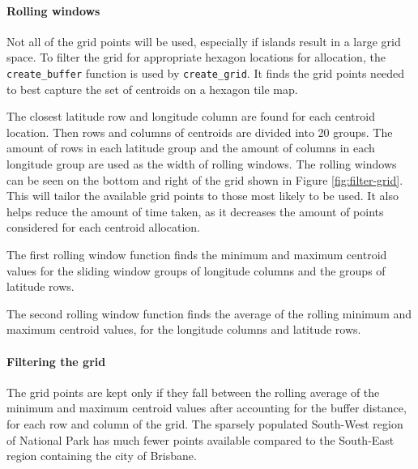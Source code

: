 \documentclass{monashthesis}
\begin{document}
\hypertarget{rolling-windows}{%
\paragraph{Rolling windows}\label{rolling-windows}}

Not all of the grid points will be used, especially if islands result in a large grid space.
To filter the grid for appropriate hexagon locations for allocation, the \texttt{create\_buffer} function is used by \texttt{create\_grid}.
It finds the grid points needed to best capture the set of centroids on a hexagon tile map.

The closest latitude row and longitude column are found for each centroid location. Then rows and columns of centroids are divided into 20 groups.
The amount of rows in each latitude group and the amount of columns in each longitude group are used as the width of rolling windows. The rolling windows can be seen on the bottom and right of the grid shown in Figure \ref{fig:filter-grid}.
This will tailor the available grid points to those most likely to be used.
It also helps reduce the amount of time taken, as it decreases the amount of points considered for each centroid allocation.

The first rolling window function finds the minimum and maximum centroid values for the sliding window groups of longitude columns and the groups of latitude rows.

The second rolling window function finds the average of the rolling minimum and maximum centroid values, for the longitude columns and latitude rows.

\hypertarget{filtering-the-grid}{%
\paragraph{Filtering the grid}\label{filtering-the-grid}}

The grid points are kept only if they fall between the rolling average of the minimum and maximum centroid values after accounting for the buffer distance, for each row and column of the grid. The sparsely populated South-West region of National Park has much fewer points available compared to the South-East region containing the city of Brisbane.
\end{document}
